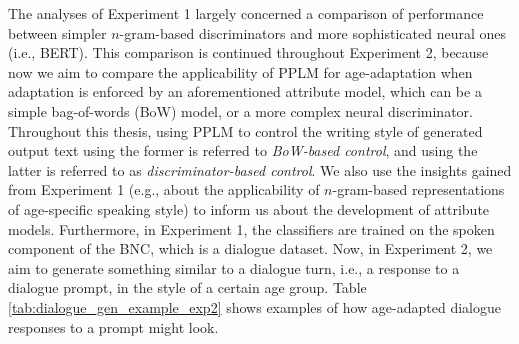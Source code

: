 The analyses of Experiment 1 largely concerned a comparison of performance between simpler $n$-gram-based discriminators and more sophisticated neural ones (i.e., BERT). This comparison is continued throughout Experiment 2, because now we aim to compare the applicability of PPLM for age-adaptation when adaptation is enforced by an aforementioned attribute model, which can be a simple bag-of-words (BoW) model, or a more complex neural discriminator. Throughout this thesis, using PPLM to control the writing style of generated output text using the former is referred to \textit{BoW-based control}, and using the latter is referred to as \textit{discriminator-based control}. We also use the insights gained from Experiment 1 (e.g., about the applicability of $n$-gram-based representations of age-specific speaking style) to inform us about the development of attribute models. Furthermore, in Experiment 1, the classifiers are trained on the spoken component of the BNC, which is a dialogue dataset. Now, in Experiment 2, we aim to generate something similar to a dialogue turn, i.e., a response to a dialogue prompt, in the style of a certain age group. Table \ref{tab:dialogue_gen_example_exp2} shows examples of how age-adapted dialogue responses to a prompt might look.

